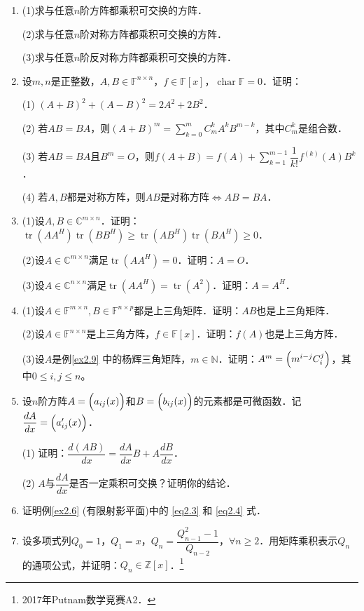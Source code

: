 \documentclass[a4paper,fontset=windows]{ctexbook}
\theoremstyle{definition}
\DeclareMathOperator{\Char}{char}
\DeclareMathOperator{\tr}{tr}
\renewcommand{\le}{\leqslant}
\renewcommand{\ge}{\geqslant}
\begin{document}
\begin{enumerate}
\item (1)求与任意$n$阶方阵都乘积可交换的方阵．

(2)求与任意$n$阶对称方阵都乘积可交换的方阵．

(3)求与任意$n$阶反对称方阵都乘积可交换的方阵．

\item 设$m,n$是正整数，$A,B\in\mathbb{F}^{n\times n}$，$f\in\mathbb{F}[x]$，$\Char\mathbb{F}=0$．证明：

(1) $(A+B)^2+(A-B)^2=2A^2+2B^2$．

(2) 若$AB=BA$，则$(A+B)^m=\sum\limits_{k=0}^mC_m^kA^kB^{m-k}$，其中$C_m^k$是组合数．

(3) 若$AB=BA$且$B^m=O$，则$f(A+B)=f(A)+\sum\limits_{k=1}^{m-1}\dfrac{1}{k!}f^{(k)}(A)B^k$．

(4) 若$A,B$都是对称方阵，则$AB$是对称方阵$\Leftrightarrow AB=BA$．

\item (1)设$A,B\in\mathbb{C}^{m\times n}$．证明：$\tr(AA^H)\tr(BB^H)\ge\tr(AB^H)\tr(BA^H)\ge 0$．

(2)设$A\in\mathbb{C}^{m\times n}$满足$\tr(AA^H)=0$．证明：$A=O$．

(3)设$A\in\mathbb{C}^{n\times n}$满足$\tr(AA^H)=\tr(A^2)$．证明：$A=A^H$．

\item (1)设$A\in\mathbb{F}^{m\times n},B\in\mathbb{F}^{n\times p}$都是上三角矩阵．证明：$AB$也是上三角矩阵．

(2)设$A\in\mathbb{F}^{n\times n}$是上三角方阵，$f\in\mathbb{F}[x]$．证明：$f(A)$也是上三角方阵．

(3)设$A$是例\ref{ex2.9} 中的杨辉三角矩阵，$m\in\mathbb{N}$．证明：$A^m=\Bigl(m^{i-j}C_i^j\Bigr)$，其中$0\le i,j\le n$。

\item 设$n$阶方阵$A=\Bigl(a_{ij}(x)\Bigr)$和$B=\Bigl(b_{ij}(x)\Bigr)$的元素都是可微函数．记$\dfrac{dA}{dx}=\Bigl(a'_{ij}(x)\Bigr)$．

(1) 证明：$\dfrac{d(AB)}{dx}=\dfrac{dA}{dx}B+A\dfrac{dB}{dx}$．

(2) $A$与$\dfrac{dA}{dx}$是否一定乘积可交换？证明你的结论．

\item 证明例\ref{ex2.6} (有限射影平面)中的 \eqref{eq2.3} 和 \eqref{eq2.4} 式．

\item 设多项式列$Q_0=1$，$Q_1=x$，$Q_n=\dfrac{Q_{n-1}^2-1}{Q_{n-2}}$，$\forall n\ge 2$．用矩阵乘积表示$Q_n$的通项公式，并证明：$Q_n\in\mathbb{Z}[x]$．\footnote{2017年Putnam数学竞赛A2．}


\end{enumerate}
\end{document}
